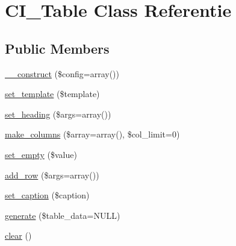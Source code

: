 \hypertarget{class_c_i___table}{}\section{C\+I\+\_\+\+Table Class Referentie}
\label{class_c_i___table}
\subsection*{Public Members}
\begin{DoxyCompactItemize}
\item 
\mbox{\hyperlink{class_c_i___table_af7f9493844d2d66e924e3c1df51ce616}{\+\_\+\+\_\+construct}} (\$config=array())
\item 
\mbox{\hyperlink{class_c_i___table_ae65d1ab2a626d4ddfda31befc2b347f6}{set\+\_\+template}} (\$template)
\item 
\mbox{\hyperlink{class_c_i___table_ac35607094955ce966330d6af51d221ef}{set\+\_\+heading}} (\$args=array())
\item 
\mbox{\hyperlink{class_c_i___table_a816eac03a6a38820918890170fd7e0d0}{make\+\_\+columns}} (\$array=array(), \$col\+\_\+limit=0)
\item 
\mbox{\hyperlink{class_c_i___table_a20b008428100a2b740c02c4bcaa45cf6}{set\+\_\+empty}} (\$value)
\item 
\mbox{\hyperlink{class_c_i___table_aed032b02068e33116d9ecf9a0eedbbbe}{add\+\_\+row}} (\$args=array())
\item 
\mbox{\hyperlink{class_c_i___table_ab6146f0f242d4bc75169c8f8e622e979}{set\+\_\+caption}} (\$caption)
\item 
\mbox{\hyperlink{class_c_i___table_ad46f79939e16f261c19157809d56aab8}{generate}} (\$table\+\_\+data=N\+U\+LL)
\item 
\mbox{\hyperlink{class_c_i___table_aa821bec12eaa7e0f649397c9675ff505}{clear}} ()
\end{DoxyCompactItemize}
